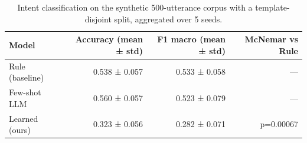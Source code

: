 \begin{table}[t]
\centering
\caption{Intent classification on the synthetic 500-utterance corpus with a template-disjoint split, aggregated over 5 seeds.}
\label{tab:intent}
\begin{tabular}{lrrr}
\hline
Model & Accuracy (mean ± std) & F1 macro (mean ± std) & McNemar vs Rule \\
\hline
Rule (baseline) & 0.538 ± 0.057 & 0.533 ± 0.058 & — \\
Few-shot LLM & 0.560 ± 0.057 & 0.523 ± 0.079 & — \\
Learned (ours) & 0.323 ± 0.056 & 0.282 ± 0.071 & p=0.00067 \\
\hline
\end{tabular}
\end{table}

